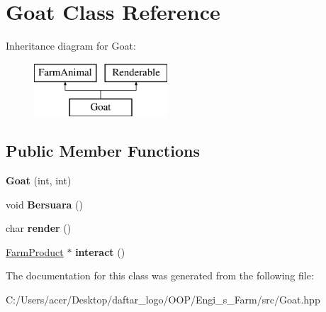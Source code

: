 \hypertarget{class_goat}{}\section{Goat Class Reference}
\label{class_goat}
Inheritance diagram for Goat\+:\begin{figure}[H]
\begin{center}
\leavevmode
\includegraphics[height=2.000000cm]{class_goat}
\end{center}
\end{figure}
\subsection*{Public Member Functions}
\begin{DoxyCompactItemize}
\item 
\mbox{\label{class_goat_a4523e314d43554c27643a9074cad01f2}} 
{\bfseries Goat} (int, int)
\item 
\mbox{\label{class_goat_a2ebf3333105a2e02a2f66821c03f916b}} 
void {\bfseries Bersuara} ()
\item 
\mbox{\label{class_goat_a04e3c2f2247555b701daf99b4417ca6e}} 
char {\bfseries render} ()
\item 
\mbox{\label{class_goat_a5228b3754a6cd38b5cb042f9be52d286}} 
\mbox{\hyperlink{class_farm_product}{Farm\+Product}} $\ast$ {\bfseries interact} ()
\end{DoxyCompactItemize}


The documentation for this class was generated from the following file\+:\begin{DoxyCompactItemize}
\item 
C\+:/\+Users/acer/\+Desktop/daftar\+\_\+logo/\+O\+O\+P/\+Engi\+\_\+s\+\_\+\+Farm/src/Goat.\+hpp\end{DoxyCompactItemize}
